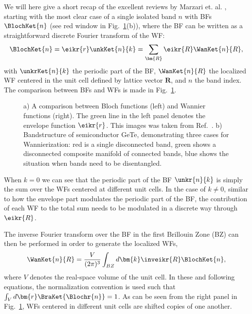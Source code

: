 We will here give a short recap of the excellent reviews by Marzari et. al. \cite{Marzari2003,Marzari2012}, starting with the most clear case of a single isolated band $n$ with BFs $\BlochKet{n}$ (see red window in Fig.~\ref{fig:Theory_blochvswan}(b)), where the BF can be written as a straightforward discrete Fourier transform of the WF: 
\begin{equation}
	\label{eq:Theory_1bandwan}
	\BlochKet{n} = \eikr{r} \unkKet{n}{k} = \sum_{\bm{R}} \eikr{R} \WanKet{n}{R},
\end{equation}
with $\unkrKet{n}{k}$ the periodic part of the BF, $\WanKet{n}{R}$ the localized WF centered in the unit cell defined by lattice vector $\bm{R}$, and $n$ the band index.
The comparison between BFs and WFs is made in Fig.~\ref{fig:Theory_blochvswan}.
\begin{figure}
	\begin{subfigure}{0.49\textwidth}
		\caption{}
	\end{subfigure}
	\begin{subfigure}{0.49\textwidth}
		\caption{}
	\end{subfigure}
	\caption{\label{fig:Theory_blochvswan} a) A comparison between Bloch functions (left) and Wannier functions (right). The green line in the left panel denotes the envelope function $\eikr{r}$. This images was taken from Ref.~\cite{Marzari2012}. b) Bandstructure of semiconductor GeTe, demonstrating three cases for Wannierization: red is a single disconnected band, green shows a disconnected composite manifold of connected bands, blue shows the situation when bands need to be disentangled.}
\end{figure}
When $k=0$ we can see that the periodic part of the BF $\unkr{n}{k}$ is simply the sum over the WFs centered at different unit cells.
In the case of $k \neq 0$, similar to how the envelope part modulates the periodic part of the BF, the contribution of each WF to the total sum needs to be modulated in a discrete way through $\eikr{R}$.

The inverse Fourier transform over the BF in the first Brillouin Zone (BZ) can then be performed in order to generate the localized WFs,
\begin{equation}
	\label{eq:Theory_wanfourier}
	\WanKet{n}{R} = \frac{V}{(2\pi)^3} \int_{BZ} d \bm{k} \inveikr{R} \BlochKet{n},
\end{equation}
where $V$ denotes the real-space volume of the unit cell.
In these and following equations, the normalization convention is used such that $\int_V d\bm{r}\BraKet{\Blochr{n}} = 1$.
As can be seen from the right panel in Fig.~\ref{fig:Theory_blochvswan}, WFs centered in different unit cells are shifted copies of one another.

